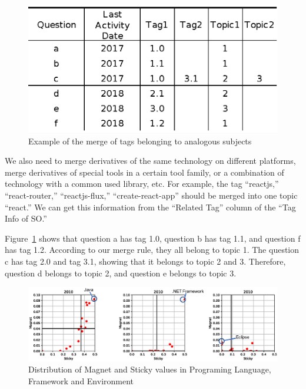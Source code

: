\documentclass[english,preprint,JIP,technote]{ipsj}
\begin{document}
\begin{figure}[t]
 \centering
 \includegraphics[width=0.80\hsize]{img/example001.eps}  
 \caption{Example of the merge of tags belonging to analogous subjects} 
 \label{fig:example1} 
\end{figure}


We also need to merge derivatives of the same technology on different platforms, merge derivatives of special tools in a certain tool family, or a combination of technology with a common used library, etc. For example, the tag ``reactjs,'' ``react-router,'' ``reactjs-flux,'' ``create-react-app'' should be merged into one topic ``react.''
We can get this information from the ``Related Tag'' column of the ``Tag Info of SO.''

Figure~\ref{fig:example1} shows that question a has tag 1.0, question b has tag 1.1, and question f has tag 1.2. According to our merge rule, they all belong to topic 1. The question c has tag 2.0 and tag 3.1, showing that it belongs to topic 2 and 3. Therefore, question d belongs to topic 2, and question e belongs to topic 3.


\begin{figure}[t]
 \centering
 \includegraphics[width=1.0\hsize]{img/2010all.eps}  
 \caption{Distribution of Magnet and Sticky values in Programing Language, Framework and Environment} 
 \label{fig:2010} 
\end{figure}
\end{document}
